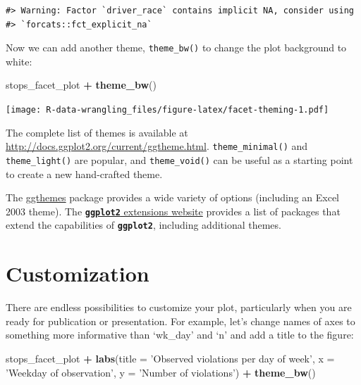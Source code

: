 \documentclass[]{book}
\newenvironment{Shaded}{\begin{snugshade}}{\end{snugshade}}
\newcommand{\DataTypeTok}[1]{\textcolor[rgb]{0.13,0.29,0.53}{#1}}
\newcommand{\KeywordTok}[1]{\textcolor[rgb]{0.13,0.29,0.53}{\textbf{#1}}}
\newcommand{\NormalTok}[1]{#1}
\newcommand{\OperatorTok}[1]{\textcolor[rgb]{0.81,0.36,0.00}{\textbf{#1}}}
\newcommand{\StringTok}[1]{\textcolor[rgb]{0.31,0.60,0.02}{#1}}
\begin{document}
\begin{verbatim}
#> Warning: Factor `driver_race` contains implicit NA, consider using
#> `forcats::fct_explicit_na`
\end{verbatim}

Now we can add another theme, \texttt{theme\_bw()} to change the plot background to white:

\begin{Shaded}
\begin{Highlighting}[]
\NormalTok{stops_facet_plot }\OperatorTok{+}
\StringTok{     }\KeywordTok{theme_bw}\NormalTok{()}
\end{Highlighting}
\end{Shaded}

\texttt{[image: R-data-wrangling\_files/figure-latex/facet-theming-1.pdf]}

The complete list of themes is available
at \url{http://docs.ggplot2.org/current/ggtheme.html}. \texttt{theme\_minimal()} and \texttt{theme\_light()} are popular, and \texttt{theme\_void()} can be useful as a starting point to create a new hand-crafted theme.

The \href{https://cran.r-project.org/web/packages/ggthemes/vignettes/ggthemes.html}{ggthemes} package
provides a wide variety of options (including an Excel 2003 theme).
The \href{https://www.ggplot2-exts.org}{\textbf{\texttt{ggplot2}} extensions website} provides a list
of packages that extend the capabilities of \textbf{\texttt{ggplot2}}, including additional themes.

\hypertarget{customization}{%
\section{Customization}\label{customization}}

There are endless possibilities to customize your plot, particularly when you are ready for publication or presentation. For example, let's change names of axes to something more informative than `wk\_day' and `n' and add a title to the figure:

\begin{Shaded}
\begin{Highlighting}[]
\NormalTok{stops_facet_plot }\OperatorTok{+}
\StringTok{  }\KeywordTok{labs}\NormalTok{(}\DataTypeTok{title =} \StringTok{'Observed violations per day of week'}\NormalTok{,}
         \DataTypeTok{x =} \StringTok{'Weekday of observation'}\NormalTok{,}
         \DataTypeTok{y =} \StringTok{'Number of violations'}\NormalTok{) }\OperatorTok{+}
\StringTok{  }\KeywordTok{theme_bw}\NormalTok{()}
\end{Highlighting}
\end{Shaded}
\end{document}
